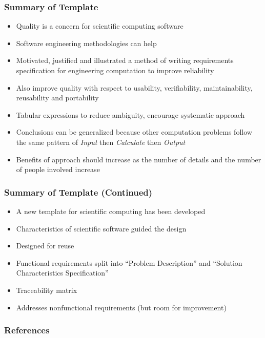 \documentclass[t,12pt,numbers,fleqn]{beamer}
\begin{document}
\begin{frame}
\frametitle{Summary of Template}
\begin{itemize}
\item Quality is a concern for scientific computing software
\item Software engineering methodologies can help
\item Motivated, justified and illustrated a method of writing requirements specification for engineering computation
to improve reliability
\item Also improve quality with respect to usability, verifiability, maintainability, reusability and portability
\item Tabular expressions to reduce ambiguity, encourage systematic approach
\item Conclusions can be generalized because other computation problems follow the same pattern of \emph{Input} then
\emph{Calculate} then \emph{Output}
\item Benefits of approach should increase as the number of details and the number of people involved increase
\end{itemize}
\end{frame}


\begin{frame}
\frametitle{Summary of Template (Continued)}
\begin{itemize}
\item A new template for scientific computing has been developed
\item Characteristics of scientific software guided the design
\item Designed for reuse
\item Functional requirements split into ``Problem Description'' and ``Solution Characteristics Specification''
\item Traceability matrix
\item Addresses nonfunctional requirements (but room for improvement)
\end{itemize}

\end{frame}


\begin{frame}[allowframebreaks]
\frametitle{References}



\end{frame}

\end{document}
